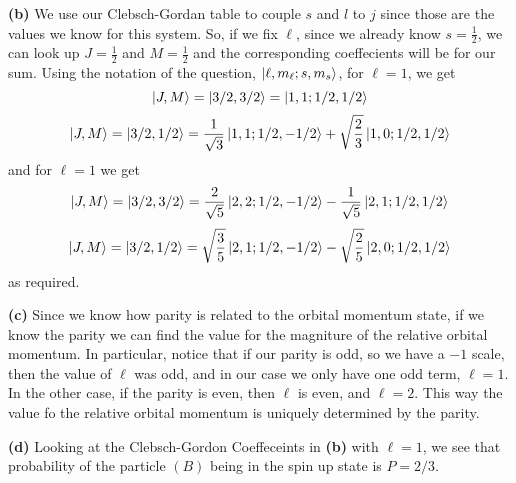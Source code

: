 \documentclass[10pt]{article}
\begin{document}
\textbf{(b)} We use our Clebsch-Gordan table to couple $s$ and $l$ to $j$ since those are the values we know for this system. So, if we fix $\ell$, since we already know $s=\frac{1}{2}$, we can look up $J = \frac{1}{2}$ and $M = \frac{1}{2}$ and the corresponding coeffecients will be for our sum. Using the notation of the question, $\ket{\ell,m_{\ell};s,m_{s}}$, for $\ell=1$, we get
\[ \ket{J,M} = \ket{3/2,3/2} = \ket{1,1;1/2,1/2} \]
\[ \ket{J,M} = \ket{3/2,1/2} = \frac{1}{\sqrt{3}}\ket{1,1;1/2,-1/2} + \sqrt{\frac{2}{3}}\ket{1,0;1/2,1/2} \]
and for $\ell=1$ we get
\[ \ket{J,M} = \ket{3/2,3/2} = \frac{2}{\sqrt{5}}\ket{2,2;1/2,-1/2} - \frac{1}{\sqrt{5}}\ket{2,1;1/2,1/2} \]
\[ \ket{J,M} = \ket{3/2,1/2} = \sqrt{\frac{3}{5}}\ket{2,1; 1/2,-1/2} - \sqrt{\frac{2}{5}}\ket{2,0;1/2,1/2} \]
as required. 

\textbf{(c)} Since we know how parity is related to the orbital momentum state, if we know the parity we can find the value for the magniture of the relative orbital momentum. In particular, notice that if our parity is odd, so we have a $-1$ scale, then the value of $\ell$ was odd, and in our case we only have one odd term, $\ell = 1$. In the other case, if the parity is even, then $\ell$ is even, and $\ell = 2$. This way the value fo the relative orbital momentum is uniquely determined by the parity.

\textbf{(d)} Looking at the Clebsch-Gordon Coeffeceints in \textbf{(b)} with $\ell = 1$, we see that probability of the particle $(B)$ being in the spin up state is $P = 2/3$.
\end{document}
